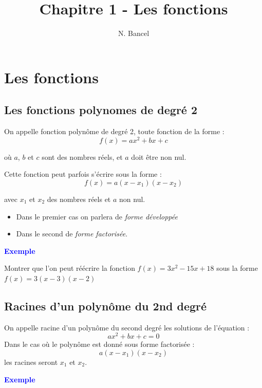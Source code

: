 \documentclass[a4paper,12pt]{article}
\begin{document}
\title{Chapitre 1 - Les fonctions}
\author{N. Bancel}

\maketitle

\def\WITH_CORRECTION{NO}

\section*{Les fonctions}



\subsection*{Les fonctions polynomes de degré 2}

On appelle fonction polynôme de degré 2, toute fonction de la forme :
\[
    f(x) = ax^2 + bx + c
\]


où $a$, $b$ et $c$ sont des nombres réels, et $a$ doit être non nul.

Cette fonction peut parfois s'écrire sous la forme : 
\[
    f(x) = a(x - x_1)(x - x_2)
\]

avec $x_1$ et $x_2$ des nombres réels et $a$ non nul.

\begin{itemize}[noitemsep]
  \item Dans le premier cas on parlera de \textit{forme développée}
  \item Dans le second de \textit{forme factorisée}.
\end{itemize}


\textbf{\textcolor{blue}{Exemple}} \par 

Montrer que l'on peut réécrire la fonction $f(x) = 3x^2 - 15x + 18$ sous la forme $f(x) = 3(x - 3)(x - 2)$

\subsection*{Racines d'un polynôme du 2nd degré}

On appelle racine d'un polynôme du second degré les solutions de l'équation :
\[
    ax^2 + bx + c = 0
\]
Dans le cas où le polynôme est donné sous forme factorisée :
\[
    a(x - x_1)(x - x_2)
\]
les racines seront $x_1$ et $x_2$.


\textbf{\textcolor{blue}{Exemple}} \par
\end{document}

